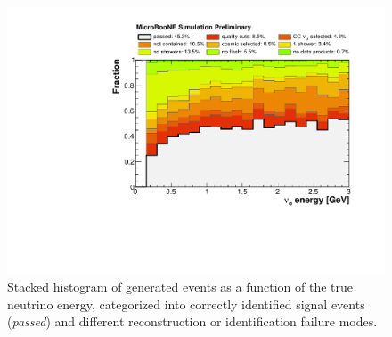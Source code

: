 \begin{figure}
\centering
    \includegraphics[width=0.65\linewidth]{figures/ineff.pdf}
  \caption{Stacked histogram of generated events as a function of the true neutrino energy, categorized into correctly identified signal events {(\emph{passed})} and different reconstruction or identification failure modes.}
  \label{fig:ineff}
\end{figure}

